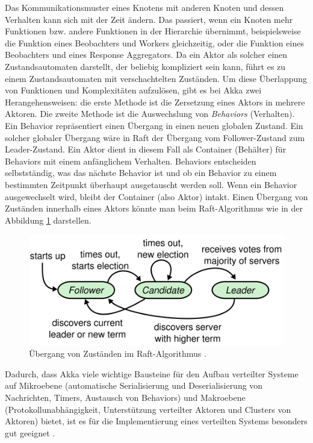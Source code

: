 Das Kommunikationsmuster eines Knotens mit anderen Knoten und dessen Verhalten kann sich mit der Zeit ändern. Das passiert, wenn ein Knoten mehr Funktionen bzw. andere Funktionen in der Hierarchie übernimmt, beispielsweise die Funktion eines Beobachters und Workers gleichzeitig, oder die Funktion eines Beobachters und eines Response Aggregators. Da ein Aktor als solcher einen Zustandsautomaten darstellt, der beliebig kompliziert sein kann, führt es zu einem Zustandsautomaten mit verschachtelten Zuständen. Um diese Überlappung von Funktionen und Komplexitäten aufzulösen, gibt es bei Akka zwei Herangehensweisen: die erste Methode ist die Zersetzung eines Aktors in mehrere Aktoren. Die zweite Methode ist die Auswechslung von \textit{Behaviors} (Verhalten). Ein Behavior repräsentiert einen Übergang in einen neuen globalen Zustand. Ein solcher globaler Übergang wäre in Raft der Übergang vom Follower-Zustand zum Leader-Zustand. Ein Aktor dient in diesem Fall als Container (Behälter) für Behaviors mit einem anfänglichem Verhalten. Behaviors entscheiden selbstständig, was das nächste Behavior ist und ob ein Behavior zu einem bestimmten Zeitpunkt überhaupt ausgetauscht werden soll. Wenn ein Behavior ausgewechselt wird, bleibt der Container (also Aktor) intakt. Einen Übergang von Zuständen innerhalb eines Aktors könnte man beim Raft-Algorithmus wie in der Abbildung \ref{fig:stateTransition} darstellen.

\begin{figure}
	\centering
	\includegraphics[width=0.7\linewidth]{images/4_state_transition}
	\caption{Übergang von Zuständen im Raft-Algorithmus \cite{Ongaro14insearch}.}
	\label{fig:stateTransition}
\end{figure}

Dadurch, dass Akka viele wichtige Bausteine für den Aufbau verteilter Systeme auf Mikroebene (automatische Serialisierung und Deserialisierung von Nachrichten, Timers, Austausch von Behaviors) und Makroebene (Protokollunabhängigkeit, Unterstützung verteilter Aktoren und Clusters von Aktoren) bietet, ist es für die Implementierung eines verteilten Systems besonders gut geeignet \cite{akka}.

